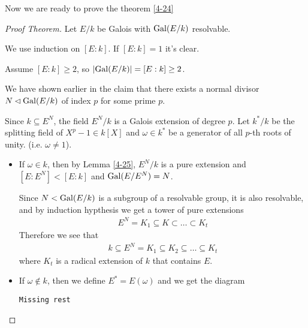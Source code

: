 Now we are ready to prove the theorem \ref{4-24}
\begin{proof}[Proof Theorem]
  Let $E/k$ be Galois with $\operatorname{Gal}(E/k)$ resolvable.

  We use induction on $[E:k]$. If $[E:k] = 1$ it's clear.

  Assume $[E:k] \geq 2$, so $\abs{\Gal(E/k)} = [E:k] \geq 2$.

  We have shown earlier in the claim that there exists a normal divisor $N \lhd \operatorname{Gal}(E/k)$ of index $p$ for some prime $p$.

  Since $k \subseteq E^{N}$, the field $E^{N}/k$ is a Galois extension of degree $p$.
  Let $k^{\ast}/k$ be the splitting field of $X^{p} - 1 \in k[X]$ and $\omega \in k^{\ast}$ be a generator of all $p$-th roots of unity. (i.e. $\omega \neq 1$).
  \begin{itemize}
    \item If $\omega \in k$, then by Lemma \ref{4-25}, $E^{N}/k$ is a pure extension and $[E:E^{N}] < [E:k]$ and $\operatorname{Gal}(E/E^{N}) = N$.
      
      Since $N < \operatorname{Gal}(E/k)$ is a subgroup of a resolvable group, it is also resolvable, and by induction hypthesis we get a tower of pure extensions
      \begin{align*}
        E^{N} = K_1 \subseteq K \subset \ldots \subset K_t
      \end{align*}
      Therefore we see that
      \begin{align*}
        k \subseteq E^{N} = K_1 \subseteq K_2 \subseteq \ldots \subseteq K_t
      \end{align*}
      where $K_t$ is a radical extension of $k$ that contains $E$.

    \item If $\omega \notin k$, then we define $E^{\ast} = E(\omega)$ and we get the diagram
      \begin{center}
      \end{center}
      \texttt{Missing rest}
  \end{itemize}
\end{proof}



